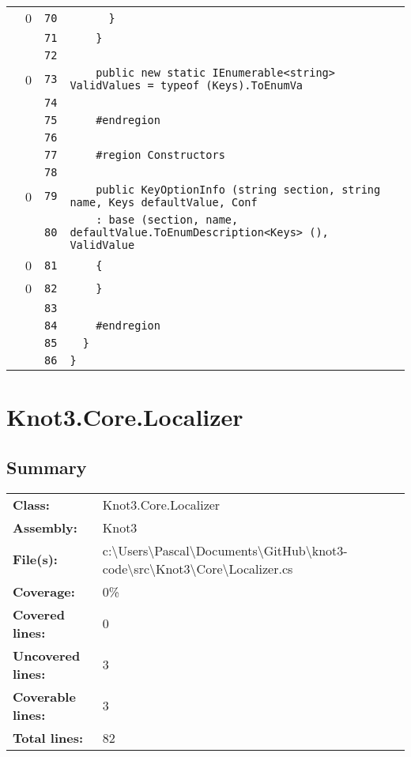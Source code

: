 \documentclass[a4paper,10pt]{article}
\begin{document}
\begin{longtable}[l]{lrrl}
\cellcolor{red} & 0 & \verb~70~ & \verb~      }~\\
\cellcolor{gray} &  & \verb~71~ & \verb~    }~\\
\cellcolor{gray} &  & \verb~72~ & \verb~~\\
\cellcolor{red} & 0 & \verb~73~ & \verb~    public new static IEnumerable<string> ValidValues = typeof (Keys).ToEnumVa~\\
\cellcolor{gray} &  & \verb~74~ & \verb~~\\
\cellcolor{gray} &  & \verb~75~ & \verb~    #endregion~\\
\cellcolor{gray} &  & \verb~76~ & \verb~~\\
\cellcolor{gray} &  & \verb~77~ & \verb~    #region Constructors~\\
\cellcolor{gray} &  & \verb~78~ & \verb~~\\
\cellcolor{red} & 0 & \verb~79~ & \verb~    public KeyOptionInfo (string section, string name, Keys defaultValue, Conf~\\
\cellcolor{gray} &  & \verb~80~ & \verb~    : base (section, name, defaultValue.ToEnumDescription<Keys> (), ValidValue~\\
\cellcolor{red} & 0 & \verb~81~ & \verb~    {~\\
\cellcolor{red} & 0 & \verb~82~ & \verb~    }~\\
\cellcolor{gray} &  & \verb~83~ & \verb~~\\
\cellcolor{gray} &  & \verb~84~ & \verb~    #endregion~\\
\cellcolor{gray} &  & \verb~85~ & \verb~  }~\\
\cellcolor{gray} &  & \verb~86~ & \verb~}~\\
\end{longtable}
\newpage
\section{Knot3.Core.Localizer}
\subsection{Summary}
\begin{longtable}[l]{ll}
\textbf{Class:} & Knot3.Core.Localizer\\
\textbf{Assembly:} & Knot3\\
\textbf{File(s):} & \begin{minipage}[t]{12cm}{c:\textbackslash Users\textbackslash Pascal\textbackslash Documents\textbackslash GitHub\textbackslash knot3-code\textbackslash src\textbackslash Knot3\textbackslash Core\textbackslash Localizer.cs}\end{minipage} \\
\textbf{Coverage:} & 0\%\\
\textbf{Covered lines:} & 0\\
\textbf{Uncovered lines:} & 3\\
\textbf{Coverable lines:} & 3\\
\textbf{Total lines:} & 82\\
\end{longtable}
\end{document}
